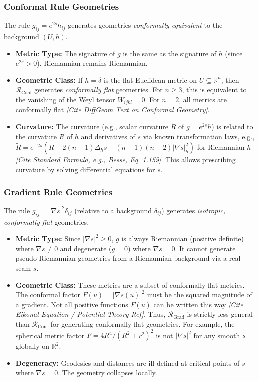 \documentclass[twoside,twocolumn]{article}
\begin{document}
\subsubsection{Conformal Rule Geometries}
The rule \( g_{ij} = e^{2s} h_{ij} \) generates geometries \emph{conformally equivalent} to the background \( (U, h) \).
\begin{itemize}
    \item \textbf{Metric Type:} The signature of \( g \) is the same as the signature of \( h \) (since \( e^{2s}>0 \)). Riemannian remains Riemannian.
    \item \textbf{Geometric Class:} If \( h = \delta \) is the flat Euclidean metric on \( U \subseteq \mathbb{R}^n \), then \( \mathcal{R}_{\text{Conf}} \) generates \emph{conformally flat} geometries. For \( n \ge 3 \), this is equivalent to the vanishing of the Weyl tensor \( W_{ijkl}=0 \). For \( n=2 \), all metrics are conformally flat \textit{[Cite DiffGeom Text on Conformal Geometry]}.
    \item \textbf{Curvature:} The curvature (e.g., scalar curvature \( \tilde{R} \) of \( g=e^{2s}h \)) is related to the curvature \( R \) of \( h \) and derivatives of \( s \) via known transformation laws, e.g., \( \tilde{R} = e^{-2s}(R - 2(n-1)\Delta_h s - (n-1)(n-2)|\nabla s|_h^2) \) for Riemannian \( h \) \textit{[Cite Standard Formula, e.g., Besse, Eq. 1.159]}. This allows prescribing curvature by solving differential equations for \( s \).
\end{itemize}

\subsubsection{Gradient Rule Geometries}
The rule \( g_{ij} = |\nabla s|^2 \delta_{ij} \) (relative to a background \( \delta_{ij} \)) generates \emph{isotropic, conformally flat} geometries.
\begin{itemize}
    \item \textbf{Metric Type:} Since \( |\nabla s|^2 \ge 0 \), \( g \) is always Riemannian (positive definite) where \( \nabla s \neq 0 \) and degenerate (\( g=0 \)) where \( \nabla s = 0 \). It cannot generate pseudo-Riemannian geometries from a Riemannian background via a real seam \( s \).
    \item \textbf{Geometric Class:} These metrics are a subset of conformally flat metrics. The conformal factor \( F(u) = |\nabla s(u)|^2 \) must be the squared magnitude of a gradient. Not all positive functions \( F(u) \) can be written this way \textit{[Cite Eikonal Equation / Potential Theory Ref]}. Thus, \( \mathcal{R}_{\text{Grad}} \) is strictly less general than \( \mathcal{R}_{\text{Conf}} \) for generating conformally flat geometries. For example, the spherical metric factor \( F=4R^4/(R^2+r^2)^2 \) is not \( |\nabla s|^2 \) for any smooth \( s \) globally on \( \mathbb{R}^2 \).
    \item \textbf{Degeneracy:} Geodesics and distances are ill-defined at critical points of \( s \) where \( \nabla s = 0 \). The geometry collapses locally.
\end{itemize}
\end{document}

